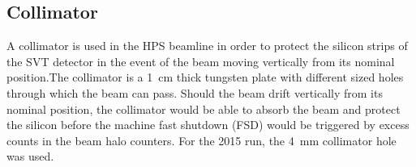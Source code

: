 \subsection{Collimator}

A collimator is used in the HPS beamline in order to protect the silicon strips of the SVT detector in the event of the beam moving vertically from its nominal position.The collimator is a 1~cm thick tungsten plate with different sized holes through which the beam can pass. Should the beam drift vertically from its nominal position, the collimator would be able to absorb the beam and protect the silicon before the machine fast shutdown (FSD) would be triggered by excess counts in the beam halo counters. For the 2015 run, the 4~mm collimator hole was used. 
